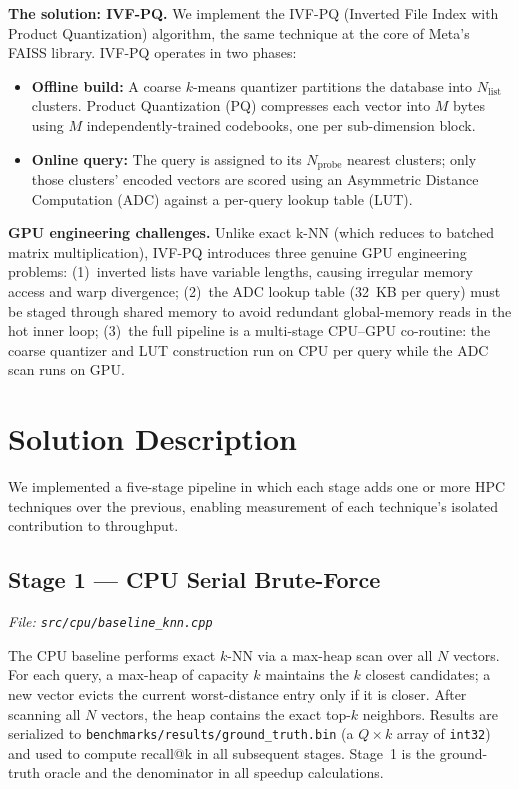 \documentclass[12pt]{article}
\newcommand{\code}[1]{\texttt{\small #1}}
\begin{document}
\textbf{The solution: IVF-PQ.}
We implement the IVF-PQ (Inverted File Index with Product Quantization) algorithm,
the same technique at the core of Meta's FAISS library.
IVF-PQ operates in two phases:
\begin{itemize}
  \item \textbf{Offline build:} A coarse $k$-means quantizer partitions the
        database into $N_\text{list}$ clusters. Product Quantization (PQ) compresses
        each vector into $M$ bytes using $M$ independently-trained codebooks,
        one per sub-dimension block.
  \item \textbf{Online query:} The query is assigned to its $N_\text{probe}$
        nearest clusters; only those clusters' encoded vectors are scored using an
        Asymmetric Distance Computation (ADC) against a per-query lookup table (LUT).
\end{itemize}

\textbf{GPU engineering challenges.}
Unlike exact k-NN (which reduces to batched matrix multiplication),
IVF-PQ introduces three genuine GPU engineering problems:
(1)~inverted lists have variable lengths, causing irregular memory access and
warp divergence;
(2)~the ADC lookup table (32~KB per query) must be staged through shared memory
to avoid redundant global-memory reads in the hot inner loop;
(3)~the full pipeline is a multi-stage CPU--GPU co-routine:
the coarse quantizer and LUT construction run on CPU per query while
the ADC scan runs on GPU.

\section{Solution Description}

We implemented a five-stage pipeline in which each stage adds one or more HPC
techniques over the previous, enabling measurement of each technique's isolated
contribution to throughput.

\subsection{Stage 1 --- CPU Serial Brute-Force}
\textit{File: \code{src/cpu/baseline\_knn.cpp}}

The CPU baseline performs exact $k$-NN via a max-heap scan over all $N$ vectors.
For each query, a max-heap of capacity $k$ maintains the $k$ closest candidates;
a new vector evicts the current worst-distance entry only if it is closer.
After scanning all $N$ vectors, the heap contains the exact top-$k$ neighbors.
Results are serialized to \code{benchmarks/results/ground\_truth.bin}
(a $Q \times k$ array of \code{int32}) and used to compute recall@k in all
subsequent stages. Stage~1 is the ground-truth oracle and the denominator
in all speedup calculations.
\end{document}
